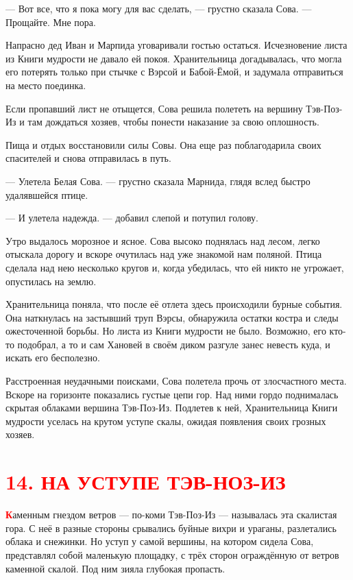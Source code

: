 \documentclass[oneside,final,14pt]{extreport}
\begin{document}
	— Вот все, что я пока могу для вас сделать, — грустно сказала Сова. — Прощайте. Мне пора.
	
	Напрасно дед Иван и Марпида уговаривали гостью остаться. Исчезновение листа из Книги мудрости не давало ей покоя. Хранительница догадывалась, что могла его потерять только при стычке с Вэрсой и Бабой-Ёмой, и задумала отправиться на место поединка.
	
	Если пропавший лист не отыщется, Сова решила полететь на вершину Тэв-Поз-Из и там дождаться хозяев, чтобы понести наказание за свою оплошность.
	
	Пища и отдых восстановили силы Совы. Она еще раз поблагодарила своих спасителей и снова отправилась в путь.
	
	— Улетела Белая Сова. — грустно сказала Марнида, глядя вслед быстро удалявшейся птице.
	
	— И улетела надежда. — добавил слепой и потупил голову.
	
	Утро выдалось морозное и ясное. Сова высоко поднялась над лесом, легко отыскала дорогу и вскоре очутилась над уже знакомой нам поляной. Птица сделала над нею несколько кругов и, когда убедилась, что ей никто не угрожает, опустилась на землю.
	
	Хранительница поняла, что после её отлета здесь происходили бурные события. Она наткнулась на застывший труп Вэрсы, обнаружила остатки костра и следы ожесточенной борьбы. Но листа из Книги мудрости не было. Возможно, его кто-то подобрал, а то и сам Хановей в своём диком разгуле занес невесть куда, и искать его бесполезно.
	
	Расстроенная неудачными поисками, Сова полетела прочь от злосчастного места. Вскоре на горизонте показались густые цепи гор. Над ними гордо поднималась скрытая облаками вершина Тэв-Поз-Из. Подлетев к ней, Хранительница Книги мудрости уселась на крутом уступе скалы, ожидая появления своих грозных хозяев.
	
	
			\section[14. На уступе Тэв-Ноз-Из]{\center \textcolor{red}{14. НА УСТУПЕ ТЭВ-НОЗ-ИЗ}}
	
	
\lettrine[findent=0pt]{\textbf{\textcolor{red}{К}}}{}аменным гнездом ветров — по-коми Тэв-Поз-Из — называлась эта скалистая гора. С неё в разные стороны срывались буйные вихри и ураганы, разлетались облака и снежинки. Но уступ у самой вершины, на котором сидела Сова, представлял собой маленькую площадку, с трёх сторон ограждённую от ветров каменной скалой. Под ним зияла глубокая пропасть.
	
\end{document}
